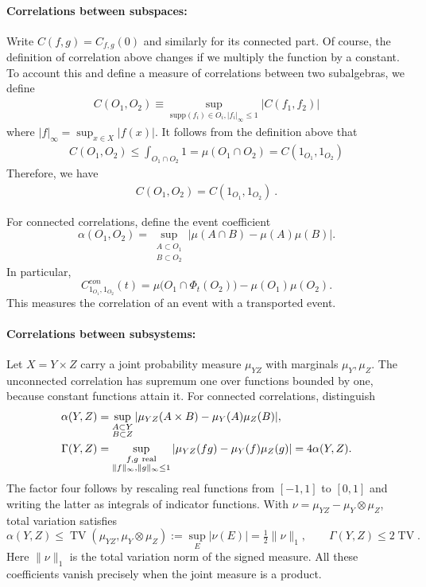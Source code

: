 \documentclass[a4paper,11pt]{article}
\theoremstyle{definition}
\newcommand{\nn}{\nonumber}
\begin{document}
\paragraph{Correlations between subspaces:} Write $C(f,g)=C_{f,g}(0)$ and similarly for its connected part. Of course, the definition of correlation above changes if we multiply the function by a constant. To account this and define a measure of correlations between two subalgebras, we define
\begin{align}
    C(O_1,O_2)\equiv \sup_{\text{supp}(f_i)\in O_i,|f_i|_\infty\leq 1}|C(f_1,f_2)|
\end{align}
where $|f|_\infty=\sup_{x\in X}|f(x)|$. It follows from the definition above that 
\begin{align}
    C(O_1,O_2)\leq \int_{O_1\cap O_2} 1=\mu(O_1\cap O_2)=C(1_{O_1},1_{O_2})
\end{align}
Therefore, we have
\begin{align}
    C(O_1,O_2)=C(1_{O_1},1_{O_2})\ .
\end{align}

For connected correlations, define the event coefficient
\begin{equation}
 \alpha(O_1,O_2)=
 \sup_{\substack{A\subset O_1\\B\subset O_2}}
 |\mu(A\cap B)-\mu(A)\mu(B)|.
\end{equation}
In particular,
\begin{equation}
 C^{con}_{1_{O_1},1_{O_2}}(t)
 =\mu\bigl(O_1\cap\Phi_t(O_2)\bigr)-\mu(O_1)\mu(O_2).
\end{equation}
This measures the correlation of an event with a transported event.

\paragraph{Correlations between subsystems:}
Let $X=Y\times Z$ carry a joint probability measure $\mu_{YZ}$ with marginals
$\mu_Y,\mu_Z$. The unconnected correlation has supremum one over functions bounded
by one, because constant functions attain it. For connected correlations, distinguish
\begin{align}
 \alpha(Y,Z)&=\sup_{\substack{A\subset Y\\B\subset Z}}
 |\mu_{YZ}(A\times B)-\mu_Y(A)\mu_Z(B)|,\nn\\
 \Gamma(Y,Z)&=\sup_{\substack{f,g\ {\rm real}\\\|f\|_\infty,\|g\|_\infty\leq1}}
 |\mu_{YZ}(fg)-\mu_Y(f)\mu_Z(g)|=4\alpha(Y,Z).
\end{align}
The factor four follows by rescaling real functions from $[-1,1]$ to $[0,1]$
and writing the latter as integrals of indicator functions. With
$\nu=\mu_{YZ}-\mu_Y\otimes\mu_Z$, total variation satisfies
\begin{equation}
 \alpha(Y,Z)\leq\operatorname{TV}(\mu_{YZ},\mu_Y\otimes\mu_Z)
 :=\sup_E|\nu(E)|=\tfrac12\|\nu\|_1,
 \qquad \Gamma(Y,Z)\leq2\operatorname{TV}.
\end{equation}
Here $\|\nu\|_1$ is the total variation norm of the signed measure. All these
coefficients vanish precisely when the joint measure is a product.
\end{document}
